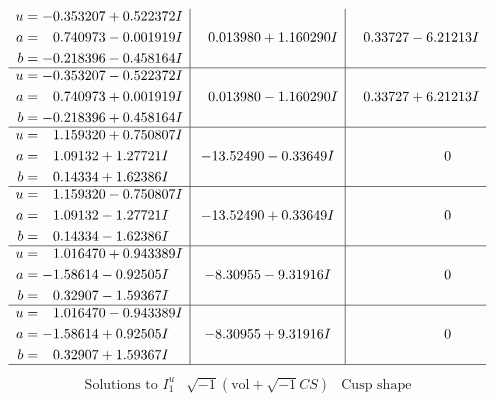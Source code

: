\documentclass[1p]{elsarticle_modified}
\theoremstyle{definition}
\newcommand{\I}{\sqrt{-1}}
\begin{document}
$$\begin{array}{c|c|c}
\begin{aligned}
u &= -0.353207 + 0.522372 I \\
a &= \phantom{-}0.740973 - 0.001919 I \\
b &= -0.218396 - 0.458164 I\end{aligned}
 & \phantom{-}0.013980 + 1.160290 I & \phantom{-}0.33727 - 6.21213 I \\ \hline\begin{aligned}
u &= -0.353207 - 0.522372 I \\
a &= \phantom{-}0.740973 + 0.001919 I \\
b &= -0.218396 + 0.458164 I\end{aligned}
 & \phantom{-}0.013980 - 1.160290 I & \phantom{-}0.33727 + 6.21213 I \\ \hline\begin{aligned}
u &= \phantom{-}1.159320 + 0.750807 I \\
a &= \phantom{-}1.09132 + 1.27721 I \\
b &= \phantom{-}0.14334 + 1.62386 I\end{aligned}
 & -13.52490 - 0.33649 I & \phantom{-0.000000 } 0 \\ \hline\begin{aligned}
u &= \phantom{-}1.159320 - 0.750807 I \\
a &= \phantom{-}1.09132 - 1.27721 I \\
b &= \phantom{-}0.14334 - 1.62386 I\end{aligned}
 & -13.52490 + 0.33649 I & \phantom{-0.000000 } 0 \\ \hline\begin{aligned}
u &= \phantom{-}1.016470 + 0.943389 I \\
a &= -1.58614 - 0.92505 I \\
b &= \phantom{-}0.32907 - 1.59367 I\end{aligned}
 & -8.30955 - 9.31916 I & \phantom{-0.000000 } 0 \\ \hline\begin{aligned}
u &= \phantom{-}1.016470 - 0.943389 I \\
a &= -1.58614 + 0.92505 I \\
b &= \phantom{-}0.32907 + 1.59367 I\end{aligned}
 & -8.30955 + 9.31916 I & \phantom{-0.000000 } 0\\
 \hline 
 \end{array}$$\newpage$$\begin{array}{c|c|c}  
\text{Solutions to }I^u_{1}& \I (\text{vol} + \sqrt{-1}CS) & \text{Cusp shape}\\

\end{array}$$
\end{document}

